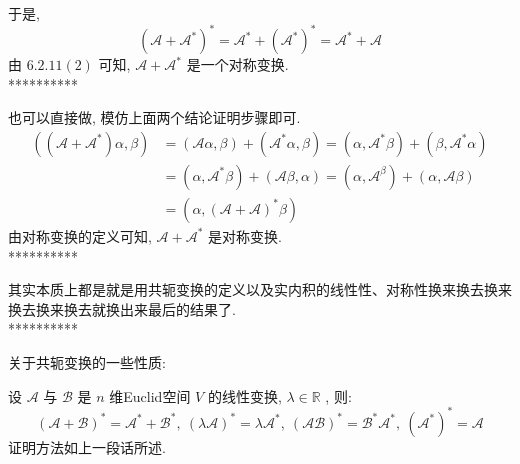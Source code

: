 \documentclass[11pt,a4paper,openany,oneside]{book}
\begin{document}
于是,
 $$  (\mathcal{A} + \mathcal{A}^*)^* = \mathcal{A}^* + (\mathcal{A}^*)^* = \mathcal{A}^* + \mathcal{A}  $$ 
由 $ 6.2.11(2) $ 可知,  $ \mathcal{A} + \mathcal{A}^* $ 是一个对称变换.  \\

**********

也可以直接做, 模仿上面两个结论证明步骤即可.
\begin{align*}
((\mathcal{A}+\mathcal{A}^*)\alpha, \beta) &= (\mathcal{A}\alpha, \beta) + (\mathcal{A}^*\alpha, \beta) = (\alpha, \mathcal{A}^*\beta) + (\beta, \mathcal{A}^*\alpha) \\
&= (\alpha, \mathcal{A}^*\beta) + (\mathcal{A}\beta, \alpha) = (\alpha, \mathcal{A}^\beta) + (\alpha, \mathcal{A}\beta) \\
&= (\alpha, (\mathcal{A}+\mathcal{A})^*\beta)
\end{align*}
由对称变换的定义可知,  $ \mathcal{A} + \mathcal{A}^* $ 是对称变换.  \\

**********

其实本质上都是就是用共轭变换的定义以及实内积的线性性、对称性换来换去换来换去换来换去就换出来最后的结果了. \\ 

**********

关于共轭变换的一些性质:

设 $ \mathcal{A} $ 与 $ \mathcal{B} $ 是 $ n $ 维Euclid空间 $ V $ 的线性变换,  $ \lambda \in \mathbb{R} $ , 则:
 $$  (\mathcal{A}+\mathcal{B})^* = \mathcal{A}^* + \mathcal{B}^*, \ (\lambda\mathcal{A})^* = \lambda\mathcal{A}^*, \ (\mathcal{AB})^* = \mathcal{B}^*\mathcal{A}^*, \ (\mathcal{A}^*)^* = \mathcal{A}  $$ 
证明方法如上一段话所述. \\  \\  \\ 
\end{document}
